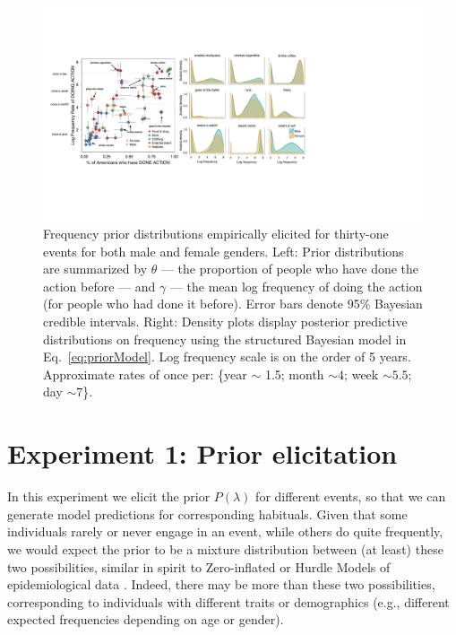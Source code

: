 \documentclass[10pt,letterpaper]{article}
\begin{document}
\begin{figure}[t]
\centering
  \includegraphics[width=\textwidth]{prior-scatter-insets4}
  \caption{Frequency prior distributions empirically elicited for thirty-one events for both male and female genders. Left: Prior distributions are summarized by $\theta$ --- the proportion of people who have done the action before --- and $\gamma$ --- the mean log frequency of doing the action (for people who had done it before).  Error bars denote 95\% Bayesian credible intervals.
  Right: Density plots display posterior predictive distributions on frequency using the structured Bayesian model in Eq.~\ref{eq:priorModel}. Log frequency scale is on the order of 5 years. Approximate rates of once per: \{year $\sim$ 1.5; month $\sim 4$; week $\sim 5.5$; day $\sim 7$\}. }
  \label{fig:priorScatter}
\end{figure}
%


\section{Experiment 1: Prior elicitation}

%
In this experiment we elicit the prior $P(\lambda)$ for different events, so that we can generate model predictions for corresponding habituals.
Given that some individuals rarely or never engage in an event, while others do quite frequently, we would expect the prior to be a mixture distribution between (at least) these two possibilities, similar in spirit to Zero-inflated or Hurdle Models of epidemiological data \cite{hurdleModels}.
Indeed, there may be more than these two possibilities, corresponding to individuals with different traits or demographics (e.g., different expected frequencies depending on age or gender). 
\end{document}

